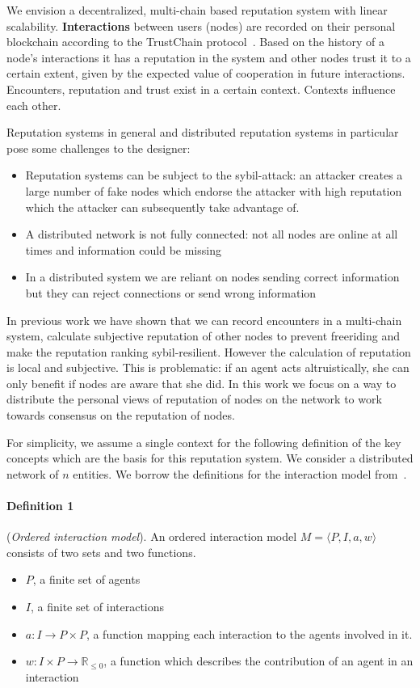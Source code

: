 We envision a decentralized, multi-chain based reputation system with linear scalability. \textbf{Interactions} between users (nodes) are recorded on their personal blockchain according to the TrustChain protocol~\cite{trustchain-protocol}. Based on the history of a node’s interactions it has a reputation in the system and other nodes trust it to a certain extent, given by the expected value of cooperation in future interactions. Encounters, reputation and trust exist in a certain context. Contexts influence each other. 

Reputation systems in general and distributed reputation systems in particular pose some challenges to the designer:

\begin{itemize}
    \item Reputation systems can be subject to the sybil-attack: an attacker creates a large number of fake nodes which endorse the attacker with high reputation which the attacker can subsequently take advantage of. 
    \item A distributed network is not fully connected: not all nodes are online at all times and information could be missing
    \item In a distributed system we are reliant on nodes sending correct information but they can reject connections or send wrong information
\end{itemize}

In previous work we have shown that we can record encounters in a multi-chain system, calculate subjective reputation of other nodes to prevent freeriding and make the reputation ranking sybil-resilient. However the calculation of reputation is local and subjective. This is problematic: if an agent acts altruistically, she can only benefit if nodes are aware that she did. In this work we focus on a way to distribute the personal views of reputation of nodes on the network to work towards consensus on the reputation of nodes.


For simplicity, we assume a single context for the following definition of the key concepts which are the basis for this reputation system.
We consider a distributed network of $n$ entities. We borrow the definitions for the interaction model from~\cite{trustchain}.

\paragraph{Definition 1} (\textit{Ordered interaction model}). An ordered interaction model $M=\langle P,I,a,w\rangle$ consists of two sets and two functions.
\begin{itemize}
    \item $P$, a finite set of agents
    \item $I$, a finite set of interactions
    \item $a : I \rightarrow P \times P$, a function mapping each interaction to the agents involved in it.
    \item $w : I \times P \rightarrow \mathbb{R}_{\leq0}$, a function which describes the contribution of an agent in an interaction
\end{itemize}


